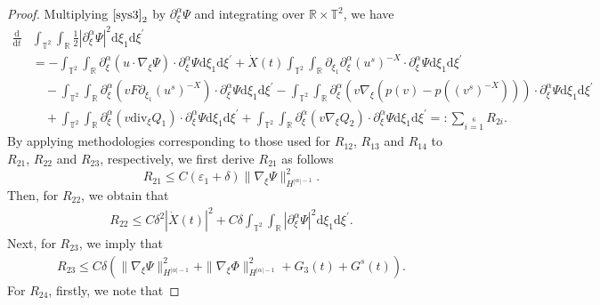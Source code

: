 \documentclass[10pt,reqno]{amsart}
\numberwithin{equation}{section}
\newcommand{\dif}{\mathrm{d}}
\newcommand{\ddiv}{\mathrm{div}}
\begin{document}
\begin{proof}
Multiplying $\eqref{sys3}_2$ by $\partial_\xi^\alpha\Psi$ and integrating over $\mathbb{R}\times\mathbb{T}^2$, we have
\[
\begin{aligned}
\frac{\dif}{\dif t}&\int_{\mathbb{T}^2}\int_{\mathbb{R}}
\frac{1}{2}|\partial_\xi^\alpha\Psi|^2\dif \xi_1\dif \xi^{\prime}\\
&=-\int_{\mathbb{T}^2}\int_{\mathbb{R}}\partial_\xi^\alpha\left( u\cdot\nabla_\xi\Psi\right)\cdot\partial_\xi^\alpha\Psi\dif \xi_1\dif \xi^{\prime}
+\dot{X}(t)\int_{\mathbb{T}^2}\int_{\mathbb{R}}\partial_{\xi_1}\partial_\xi^\alpha(u^s)^{-X}\cdot\partial_\xi^\alpha\Psi\dif \xi_1\dif \xi^{\prime}\\
&\quad-\int_{\mathbb{T}^2}\int_{\mathbb{R}}\partial_\xi^\alpha\left(vF\partial_{\xi_1}(u^s)^{-X}\right)\cdot\partial_\xi^\alpha\Psi\dif \xi_1\dif \xi^{\prime}
-\int_{\mathbb{T}^2}\int_{\mathbb{R}}\partial_\xi^\alpha\left(v\nabla_\xi\left(p(v)-p((v^s)^{-X})\right)\right)\cdot\partial_\xi^\alpha\Psi\dif \xi_1\dif \xi^{\prime}\\
&\quad+\int_{\mathbb{T}^2}\int_{\mathbb{R}}\partial_\xi^\alpha\left(v\ddiv_\xi Q_1\right)\cdot\partial_\xi^\alpha\Psi\dif \xi_1\dif \xi^{\prime}
+\int_{\mathbb{T}^2}\int_{\mathbb{R}}\partial_\xi^\alpha\left(v\nabla_\xi Q_2\right)\cdot\partial_\xi^\alpha\Psi\dif \xi_1\dif \xi^{\prime}=:\sum\limits_{i=1}\limits^{6}R_{2i}.
\end{aligned}
\]
By applying methodologies corresponding to those used for $R_{12}$, $R_{13}$ and $R_{14}$ to $R_{21}$, $R_{22}$ and $R_{23}$, respectively, we first derive $R_{21}$ as follows
\begin{equation}\label{r21}
R_{21}\le C(\varepsilon_1+\delta)\|\nabla_\xi\Psi\|^2_{H^{|\alpha|-1}}.
\end{equation}
Then, for $R_{22}$, we obtain that
\begin{equation}\label{r22}
\begin{aligned}
R_{22}
\le C\delta^2|\dot{X}(t)|^2+C\delta\int_{\mathbb{T}^2}\int_{\mathbb{R}}|\partial_\xi^\alpha\Psi|^2\dif \xi_1\dif \xi^{\prime}.
\end{aligned}
\end{equation}
Next, for $R_{23}$, we imply that
\begin{equation}\label{r23}
\begin{aligned}
R_{23}
\le  C\delta\left(\|\nabla_\xi\Psi\|_{H^{|\alpha|-1}}^2+\|\nabla_\xi\Phi\|_{H^{|\alpha|-1}}^2+G_3(t)+G^s(t)\right)
.
\end{aligned}
\end{equation}
For $R_{24}$, firstly, we note that

\end{proof}
\end{document}
